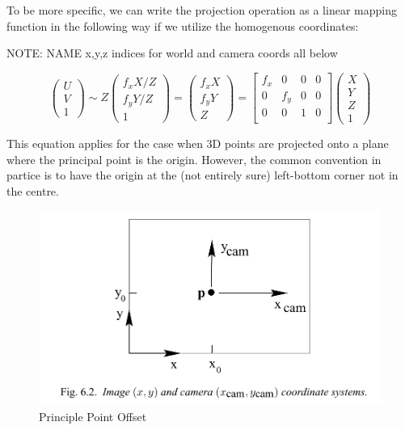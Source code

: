 \documentclass[a4paper]{report}
\numberwithin{figure}{section}
\begin{document}
To be more specific,
we can write the projection operation as a linear mapping function 
in the following way if we utilize the homogenous coordinates:

NOTE: NAME x,y,z indices for world and camera coords all below

\begin{equation}
  \begin{pmatrix}
    U\\
    V\\
    1
  \end{pmatrix}
  \sim
  Z
  \begin{pmatrix}
    f_xX/Z\\
    f_yY/Z\\
    1
  \end{pmatrix}
  =
  \begin{pmatrix}
    f_xX\\
    f_yY\\
    Z
  \end{pmatrix}
  =
  \begin{bmatrix}
    f_x & 0 & 0 & 0\\
    0 & f_y & 0 & 0\\
    0 & 0 & 1 & 0\\
  \end{bmatrix}
  \begin{pmatrix}
    X\\
    Y\\
    Z\\
    1
  \end{pmatrix}
\end{equation} \label{eq:proj_func_w_f}

This equation applies for the case when 3D points are 
projected onto a plane where the principal point is the origin. 
However, the common convention in partice 
is to have the origin at the (not entirely sure) left-bottom corner not in the centre.

\begin{figure}[H]
	\centering
	\includegraphics[width=\linewidth,natwidth=640,natheight=640]
  {fig/ref_imgs/pinhole_offset.png}
	\caption{Principle Point Offset}
	\label{fig:pinhole_offset}
\end{figure}
\end{document}
